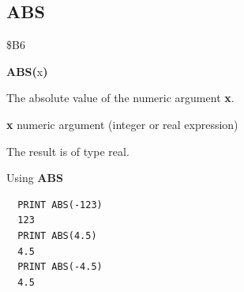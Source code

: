 \subsection{ABS}
\begin{description}[leftmargin=2cm,style=nextline]
\item [Token:] \$B6
\item [Format:] {\bf ABS(}x{\bf)}
\item [Returns:] The absolute value of the numeric
                argument {\bf x}.

               {\bf x} numeric argument (integer or real expression)
\item [Remarks:] The result is of type real.
\item [Example:] Using {\bf ABS}

\begin{tcolorbox}[colback=black,coltext=white]
\verbatimfont{\codefont}
\begin{verbatim}
  PRINT ABS(-123)
  123
  PRINT ABS(4.5)
  4.5
  PRINT ABS(-4.5)
  4.5
\end{verbatim}
\end{tcolorbox}
\end{description}


\newpage
